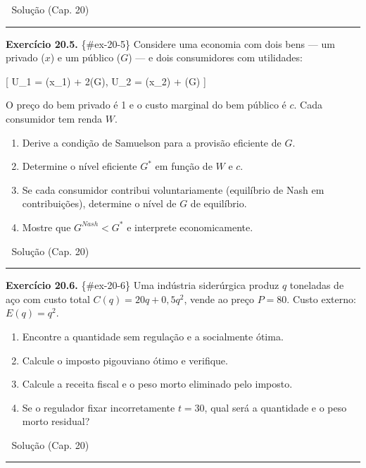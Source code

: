 \documentclass[11pt,twoside,openright]{book}
\providecommand{\tightlist}{\setlength{\itemsep}{0pt}\setlength{\parskip}{0pt}}
\begin{document}
🔑 Solução (Cap. 20)

\begin{center}\rule{0.5\linewidth}{0.5pt}\end{center}

\textbf{Exercício 20.5.} \{\#ex-20-5\} Considere uma economia com dois
bens --- um privado (\(x\)) e um público (\(G\)) --- e dois consumidores
com utilidades:

{[} U\_1 = \ln(x\_1) + 2\ln(G), \quad U\_2 = \ln(x\_2) + \ln(G) {]}

O preço do bem privado é 1 e o custo marginal do bem público é \(c\).
Cada consumidor tem renda \(W\).

\begin{enumerate}
\def\labelenumi{(\alph{enumi})}
\tightlist
\item
  Derive a condição de Samuelson para a provisão eficiente de \(G\).
\item
  Determine o nível eficiente \(G^*\) em função de \(W\) e \(c\).
\item
  Se cada consumidor contribui voluntariamente (equilíbrio de Nash em
  contribuições), determine o nível de \(G\) de equilíbrio.
\item
  Mostre que \(G^{Nash} < G^*\) e interprete economicamente.
\end{enumerate}

🔑 Solução (Cap. 20)

\begin{center}\rule{0.5\linewidth}{0.5pt}\end{center}

\textbf{Exercício 20.6.} \{\#ex-20-6\} Uma indústria siderúrgica produz
\(q\) toneladas de aço com custo total \(C(q) = 20q + 0{,}5q^2\), vende
ao preço \(P = 80\). Custo externo: \(E(q) = q^2\).

\begin{enumerate}
\def\labelenumi{(\alph{enumi})}
\tightlist
\item
  Encontre a quantidade sem regulação e a socialmente ótima.
\item
  Calcule o imposto pigouviano ótimo e verifique.
\item
  Calcule a receita fiscal e o peso morto eliminado pelo imposto.
\item
  Se o regulador fixar incorretamente \(t = 30\), qual será a quantidade
  e o peso morto residual?
\end{enumerate}

🔑 Solução (Cap. 20)

\begin{center}\rule{0.5\linewidth}{0.5pt}\end{center}
\end{document}
